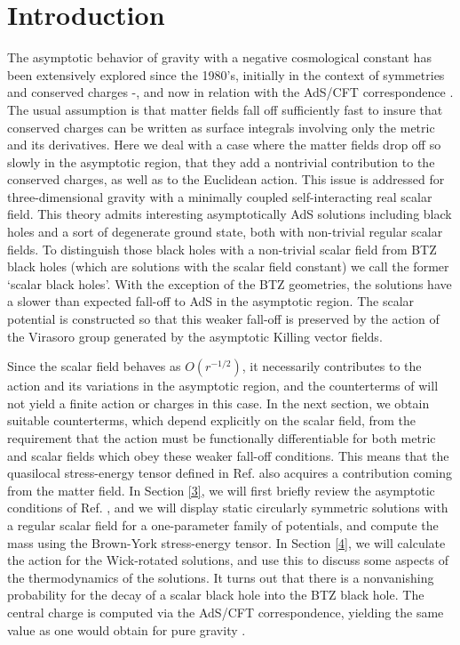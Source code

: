 \documentclass[a4paper,12pt]{article}
\begin{document}
\section{Introduction}

The asymptotic behavior of gravity with a negative cosmological constant has
been extensively explored since the 1980's, initially in the context
of symmetries and conserved charges \cite{Abbott:1981ff}-\cite
{Barnich:2003xg}, and now in relation with the AdS/CFT correspondence 
\cite{Maldacena:1997re,Gubser:1998bc,Witten:1998qj}. The usual assumption is
that matter fields fall off sufficiently fast to insure that conserved
charges can be written as surface integrals involving only the metric and
its derivatives. Here we deal with a case where the matter fields
drop off so slowly in the asymptotic region, that they add a nontrivial
contribution to the conserved charges, as well as to the Euclidean action.
This issue is addressed for three-dimensional gravity with a minimally
coupled self-interacting real scalar field. This theory admits interesting
asymptotically AdS solutions including black holes \cite{HMTZ} and a sort of
degenerate ground state, both with non-trivial regular scalar fields.  
To distinguish those black holes with a non-trivial scalar field from BTZ 
black holes (which  are solutions with the scalar field constant) we 
call the former `scalar black holes'.  With 
the exception of 
the BTZ geometries, the solutions have a slower than expected fall-off
to AdS in the asymptotic region. The scalar potential
is constructed so that this weaker fall-off is preserved by the action
of the Virasoro group generated by the asymptotic Killing vector fields.

Since the scalar field behaves as $O(r^{-1/2})$,  it necessarily contributes to the
action and its variations in the asymptotic region, and the counterterms
of  \cite{Henningson:1998gx}  will not yield a finite action or charges \cite
{Balasubramanian-Kraus} in this
case. In the next section, we obtain suitable counterterms, which depend
explicitly on the scalar field, from the requirement
that the action must be functionally differentiable for both metric
and scalar fields which obey these weaker fall-off conditions. This means that the
quasilocal stress-energy tensor defined in Ref. \cite{Brown-York} also
acquires a contribution coming from the matter field. In Section \ref{3}, we
will first briefly review the asymptotic conditions of Ref. \cite{HMTZ}, and
we will display static circularly symmetric solutions with a regular
scalar field for a one-parameter family of potentials, and compute the mass 
using the Brown-York stress-energy tensor. In Section \ref{4}, we will
calculate the action for the Wick-rotated solutions, and use this to discuss
some aspects of the thermodynamics of the solutions. It turns out that there
is a nonvanishing probability for the decay of a scalar black hole into the
BTZ black hole. The central charge is computed via the AdS/CFT
correspondence, yielding the same value as one would obtain for pure gravity \cite
{Brown-Henneaux}.
\end{document}
